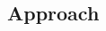 \documentclass{grantplate}
\begin{document}

\cleardoublepage


\cleardoublepage
\begin{multicols}{2}



\section{Approach}





\end{multicols}


\clearpage

\printbibliography
\end{document}
